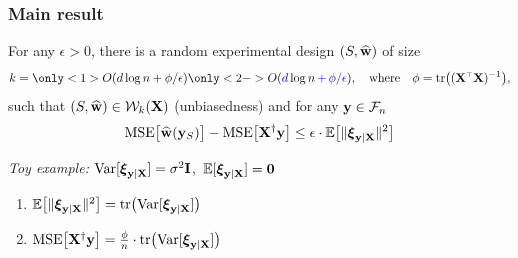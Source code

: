\documentclass{beamer}
\begin{document}
  \begin{frame}
    \frametitle{Main result}
    \begin{theorem}
For any $\epsilon>0$, there is a random experimental design $(S,\widehat{\mathbf w})$
of size
\[k=\only<1>{O(d\log n+\phi/\epsilon)}\only<2->{O(\Blue{d}\log n\Blue{\,+\,\phi/\epsilon})}, \quad\text{where}\quad\phi=\tr\big((\X^\top\X)^{-1}\big),\]
such that $(S,\widehat{\mathbf w})\in\mathcal{W}_k(\mathbf X)$ (unbiasedness) and for any $\mathbf y\in\mathcal{F}_n$
\begin{align*}
\mathrm{MSE}\big[\wbh(\y_S)\big] - \mathrm{MSE}\big[\X^\dagger\y\big]
  \leq \epsilon\cdot 
  \E\big[\|\xib_{\y|\X}\|^2\big]%
\end{align*}
\end{theorem}
\pause\vspace{4mm}

\textit{Toy example:} \quad$\mathrm{Var}[\boldsymbol\xi_{\mathbf y|\mathbf X}]=\sigma^2\mathbf I$,\quad\ 
$\mathbb E[\boldsymbol\xi_{\mathbf y|\mathbf X}]=\mathbf 0$
\pause\vspace{3mm}
\begin{enumerate}
  \item $\mathbb E\big[\|\boldsymbol\xi_{\mathbf y|\mathbf X}\|^2\big]
    =\mathrm{tr}\big(\mathrm{Var}[\boldsymbol\xi_{\mathbf y|\mathbf X}]\big)$
    \pause\vspace{1mm}
  \item $\MSE{\X^\dagger\y} %
    = \frac\phi n\cdot \tr\big(\Var[\xib_{\y|\X}]\big)$
  \end{enumerate}
  
\end{frame}
\end{document}
